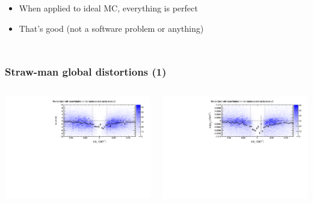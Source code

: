 \documentclass[compress]{beamer}
\begin{document}
\begin{frame}
\begin{columns}
\begin{itemize}
\item When applied to ideal MC, everything is perfect

\item That's good (not a software problem or anything)
\end{itemize}
\end{columns}
\end{frame}

\begin{frame}
\frametitle{Straw-man global distortions (1)}

\begin{columns}

\includegraphics[width=\linewidth]{residuals_layerRotation.pdf}

\includegraphics[width=\linewidth]{curvature_layerRotation.pdf}


\end{columns}
\end{frame}
\end{document}
